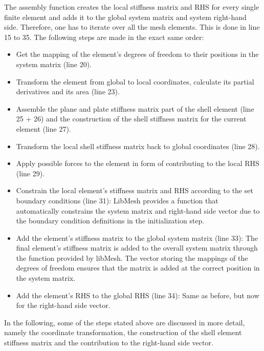    The assembly function creates the local stiffness matrix and RHS for every single finite element and adds it to the global system matrix and system right-hand side. Therefore, one has to iterate over all the mesh elements. This is done in line 15 to 35. The following steps are made in the exact same order:
   \begin{itemize}
   	\item Get the mapping of the element's degrees of freedom to their positions in the system matrix (line 20).
   	\item Transform the element from global to local coordinates, calculate its partial derivatives and its area (line 23).
   	\item Assemble the plane and plate stiffness matrix part of the shell element (line 25 + 26) and the construction of the shell stiffness matrix for the current element (line 27).
   	\item Transform the local shell stiffness matrix back to global coordinates (line 28).
   	\item Apply possible forces to the element in form of contributing to the local RHS (line 29).
   	\item Constrain the local element's stiffness matrix and RHS according to the set boundary conditions (line 31): LibMesh provides a function that automatically constrains the system matrix and right-hand side vector due to the boundary condition definitions in the initialization step.
    \item Add the element's stiffness matrix to the global system matrix (line 33): The final element's stiffness matrix is added to the overall system matrix through the function provided by libMesh. The vector storing the mappings of the degrees of freedom ensures that the matrix is added at the correct position in the system matrix.
    \item Add the element's RHS to the global RHS (line 34): Same as before, but now for the right-hand side vector.
   \end{itemize}
   In the following, some of the steps stated above are discussed in more detail, namely the coordinate transformation, the construction of the shell element stiffness matrix and the contribution to the right-hand side vector.
   

